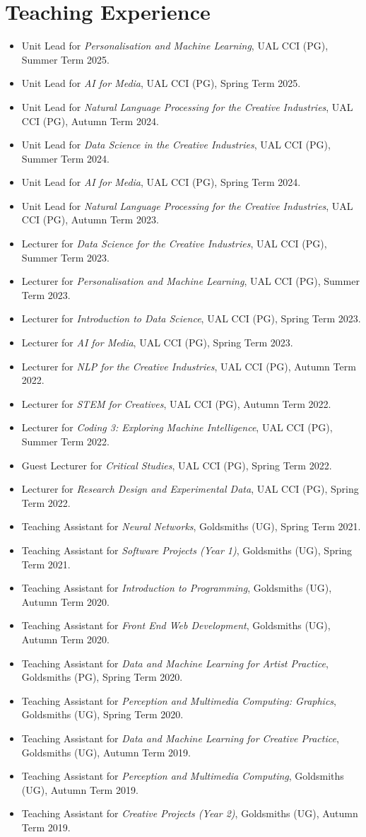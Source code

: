 \documentclass[letterpaper,11pt]{article}
\newcommand{\resumeItem}[2]{
  \item\small{
    \textbf{#1}{ #2 \vspace{-2pt}}
  }
}
\newcommand{\resumeSubItem}[2]{\resumeItem{#1}{#2}\vspace{-4pt}}
\newcommand{\resumeSubHeadingListStart}{\begin{itemize}[leftmargin=*]}
\newcommand{\resumeSubHeadingListEnd}{\end{itemize}}
\begin{document}
\section{Teaching Experience}
 \resumeSubHeadingListStart
  \resumeSubItem{}{Unit Lead for \textit{Personalisation and Machine Learning}, UAL CCI (PG), Summer Term 2025.}
  \resumeSubItem{}{Unit Lead for \textit{AI for Media}, UAL CCI (PG), Spring Term 2025.}
  \resumeSubItem{}{Unit Lead for \textit{Natural Language Processing for the Creative Industries}, UAL CCI (PG), Autumn Term 2024.}
  \resumeSubItem{}{Unit Lead for \textit{Data Science in the Creative Industries}, UAL CCI (PG), Summer Term 2024.}
  \resumeSubItem{}{Unit Lead for \textit{AI for Media}, UAL CCI (PG), Spring Term 2024.}
  \resumeSubItem{}{Unit Lead for \textit{Natural Language Processing for the Creative Industries}, UAL CCI (PG), Autumn Term 2023.}
  \resumeSubItem{}{Lecturer for \textit{Data Science for the Creative Industries}, UAL CCI (PG), Summer Term 2023.}
  \resumeSubItem{}{Lecturer for \textit{Personalisation and Machine Learning}, UAL CCI (PG), Summer Term 2023.}
  \resumeSubItem{}{Lecturer for \textit{Introduction to Data Science}, UAL CCI (PG), Spring Term 2023.}
  \resumeSubItem{}{Lecturer for \textit{AI for Media}, UAL CCI (PG), Spring Term 2023.}
  \resumeSubItem{}{Lecturer for \textit{NLP for the Creative Industries}, UAL CCI (PG), Autumn Term 2022.}
  \resumeSubItem{}{Lecturer for \textit{STEM for Creatives}, UAL CCI (PG), Autumn Term 2022.}
  \resumeSubItem{}{Lecturer for \textit{Coding 3: Exploring Machine Intelligence}, UAL CCI (PG), Summer Term 2022.}
  \resumeSubItem{}{Guest Lecturer for \textit{Critical Studies}, UAL CCI (PG), Spring Term 2022.}
  \resumeSubItem{}{Lecturer for \textit{Research Design and Experimental Data}, UAL CCI (PG), Spring Term 2022.}
  \resumeSubItem{}{Teaching Assistant for \textit{Neural Networks}, Goldsmiths (UG), Spring Term 2021.}
  \resumeSubItem{}{Teaching Assistant for \textit{Software Projects (Year 1)}, Goldsmiths (UG), Spring Term 2021.}
  \resumeSubItem{}{Teaching Assistant for \textit{Introduction to Programming}, Goldsmiths (UG), Autumn Term 2020.}
  \resumeSubItem{}{Teaching Assistant for \textit{Front End Web Development}, Goldsmiths (UG), Autumn Term 2020.}
  \resumeSubItem{}{Teaching Assistant for \textit{Data and Machine Learning for Artist Practice}, Goldsmiths (PG), Spring Term 2020.}
  \resumeSubItem{}{Teaching Assistant for \textit{Perception and Multimedia Computing: Graphics}, Goldsmiths (UG), Spring Term 2020.}
  \resumeSubItem{}{Teaching Assistant for \textit{Data and Machine Learning for Creative Practice}, Goldsmiths (UG), Autumn Term 2019.}
  \resumeSubItem{}{Teaching Assistant for \textit{Perception and Multimedia Computing}, Goldsmiths (UG), Autumn Term 2019.}
  \resumeSubItem{}{Teaching Assistant for \textit{Creative Projects (Year 2)}, Goldsmiths (UG), Autumn Term 2019.}
 \resumeSubHeadingListEnd
 
\end{document}
